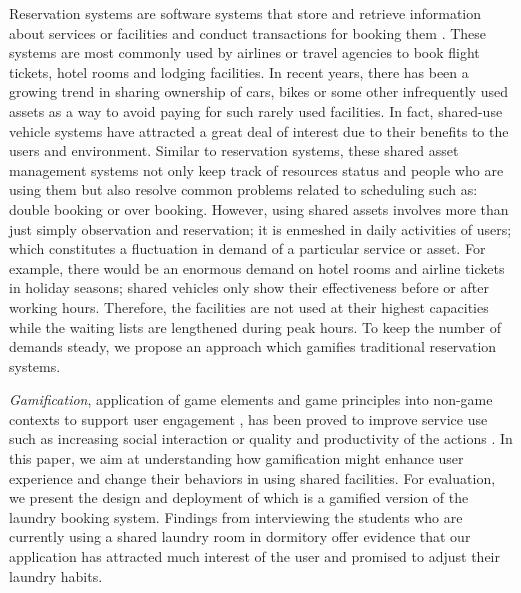 Reservation systems are software systems that store and retrieve information about services or facilities and conduct transactions for booking them \cite{wiki:CRS}. These systems are most commonly used by airlines or travel agencies to book flight tickets, hotel rooms and lodging facilities. In recent years, there has been a growing trend in sharing ownership of cars, bikes or some other infrequently used assets as a way to avoid paying for such rarely used facilities. In fact, shared-use vehicle systems \cite{barth2002shared, nextbike} have attracted a great deal of interest due to their benefits to the users and environment. Similar to reservation systems, these shared asset management systems not only keep track of resources status and people who are using them but also resolve common problems related to scheduling such as: double booking or over booking. However, using shared assets involves more than just simply observation and reservation; it is enmeshed in daily activities of users; which constitutes a fluctuation in demand of a particular service or asset. For example, there would be an enormous demand on hotel rooms and airline tickets in holiday seasons; shared vehicles only show their effectiveness before or after working hours. Therefore, the facilities are not used at their highest capacities while the waiting lists are lengthened during peak hours. To keep the number of demands steady, we propose an approach which gamifies traditional reservation systems.

\emph{Gamification}, application of game elements and game principles into non-game contexts to support user engagement \cite{deterding2011game, hamari2014does}, has been proved to improve service use such as increasing social interaction or quality and productivity of the actions \cite{hamari2014does}. In this paper, we aim at understanding how gamification might enhance user experience and change their behaviors in using shared facilities. For evaluation, we present the design and deployment of {\toolname} which is a gamified version of the laundry booking system. Findings from interviewing the students who are currently using a shared laundry room in dormitory offer evidence that our application has attracted much interest of the user and promised to adjust their laundry habits.